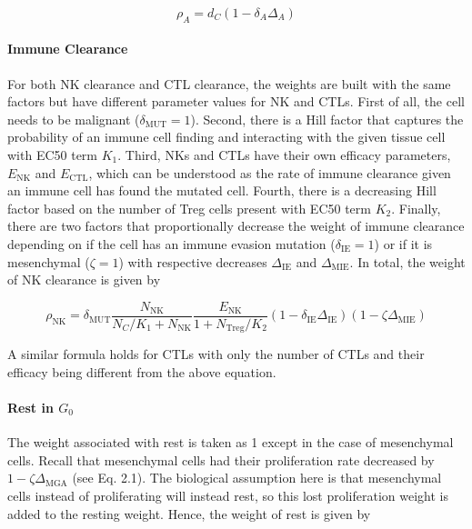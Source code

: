 \documentclass[11pt]{article}
\begin{document}
\begin{equation}\tag{2.2}
\rho_A = d_C(1-\delta_{A}\Delta_A)
\end{equation}

\paragraph{Immune Clearance}
For both NK clearance and CTL clearance, the weights are built with the same factors but have different parameter values for NK and CTLs.
First of all, the cell needs to be malignant ($\delta_{\text{MUT}}=1$).
Second, there is a Hill factor that captures the probability of an immune cell finding and interacting with the given tissue cell with EC50 term $K_1$.
Third, NKs and CTLs have their own efficacy parameters, $E_{\text{NK}}$ and $E_{\text{CTL}}$, which can be understood as the rate of immune clearance given an immune cell has found the mutated cell.
Fourth, there is a decreasing Hill factor based on the number of Treg cells present with EC50 term $K_2$.
Finally, there are two factors that proportionally decrease the weight of immune clearance depending on if the cell has an immune evasion mutation ($\delta_{\text{IE}}=1$) or if it is mesenchymal ($\zeta=1$) with respective decreases $\Delta_{\text{IE}}$ and $\Delta_{\text{MIE}}$.
In total, the weight of NK clearance is given by

\begin{equation}\tag{2.3}
\rho_{\text{NK}} =\delta_{\text{MUT}} \frac{N_{\text{NK}}}{N_C/K_{1}+N_{\text{NK}}}  \frac{E_{\text{NK}}}{1+N_{\text{Treg}}/K_2} (1-\delta_{\text{IE}}\Delta_{\text{IE}})(1-\zeta \Delta_{\text{MIE}})
\end{equation}

A similar formula holds for CTLs with only the number of CTLs and their efficacy being different from the above equation.


\paragraph{Rest in $G_0$} 
The weight associated with rest is taken as 1 except in the case of mesenchymal cells.
Recall that mesenchymal cells had their proliferation rate decreased by $1-\zeta\Delta_{\text{MGA}}$ (see Eq. 2.1).
The biological assumption here is that mesenchymal cells instead of proliferating will instead rest, so this lost proliferation weight is added to the resting weight.
Hence, the weight of rest is given by
\end{document}
